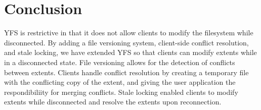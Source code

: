 \documentclass[11pt]{article}
\begin{document}
\section{Conclusion}

YFS is restrictive in that it does not allow clients to modify the filesystem while disconnected. By adding a file versioning system, client-side conflict resolution, and stale locking, we have extended YFS so that clients can modify extents while in a disconnected state. File versioning allows for the detection of conflicts between extents. Clients handle conflict resolution by creating a temporary file with the conflicting copy of the extent, and giving the user application the respondibiliity for merging conflicts. Stale locking enabled clients to modify extents while disconnected and resolve the extents upon reconnection. 
\end{document}
